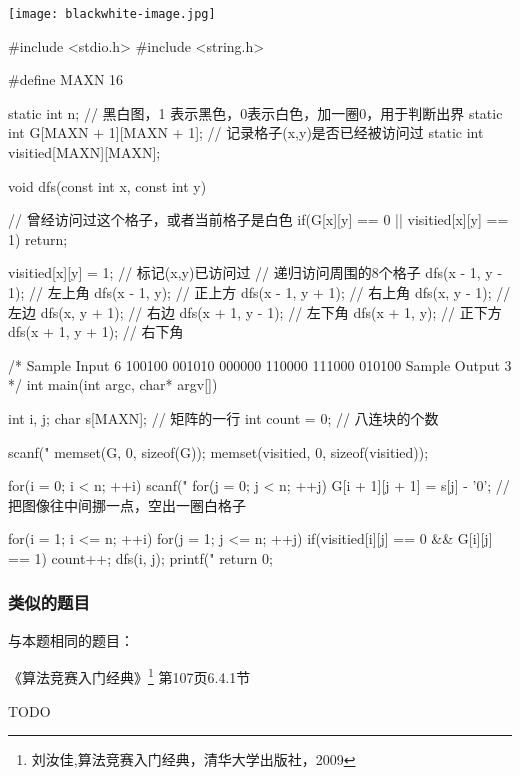 \begin{center}
\texttt{[image: blackwhite-image.jpg]}\\
\label{fig:blackwhiteImage}
\end{center}

\begin{Codex}[label=blackwhite_image.c]
#include <stdio.h>
#include <string.h>

#define MAXN 16

static int n;
// 黑白图，1 表示黑色，0表示白色，加一圈0，用于判断出界
static int G[MAXN + 1][MAXN + 1];
// 记录格子(x,y)是否已经被访问过
static int visitied[MAXN][MAXN];

void dfs(const int x, const int y) {
    // 曾经访问过这个格子，或者当前格子是白色
    if(G[x][y] == 0 || visitied[x][y] == 1)  return;
    
    visitied[x][y] = 1; // 标记(x,y)已访问过
    // 递归访问周围的8个格子
    dfs(x - 1, y - 1); // 左上角
    dfs(x - 1, y); // 正上方
    dfs(x - 1, y + 1); // 右上角
    dfs(x, y - 1); // 左边
    dfs(x, y + 1); // 右边
    dfs(x + 1, y - 1); // 左下角
    dfs(x + 1, y); // 正下方
    dfs(x + 1, y + 1); // 右下角
}

/*
Sample Input
6
100100
001010
000000
110000
111000
010100
Sample Output
3
*/
int main(int argc, char* argv[]) {
    int i, j;
    char s[MAXN]; // 矩阵的一行
    int count = 0; // 八连块的个数

    scanf("%
    memset(G, 0, sizeof(G));
    memset(visitied, 0, sizeof(visitied));

    for(i = 0; i < n; ++i) {
        scanf("%
        for(j = 0; j < n; ++j) {
            G[i + 1][j + 1] = s[j] - '0'; // 把图像往中间挪一点，空出一圈白格子
        }
    }


    for(i = 1; i <= n; ++i) {
        for(j = 1; j <= n; ++j) {
            if(visitied[i][j] == 0 && G[i][j] == 1) {
                count++;
                dfs(i, j);
            }
        }
    }
    printf("%
    return 0;
}
\end{Codex}

\subsubsection{类似的题目}
与本题相同的题目：
\begindot
\item 《算法竞赛入门经典》\footnote{刘汝佳,算法竞赛入门经典，清华大学出版社，2009} 第107页6.4.1节
\item  TODO
\myenddot

